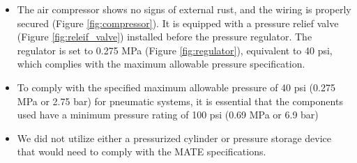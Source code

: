 \documentclass[11pt, twocolumn]{article}
\begin{document}
\begin{itemize}[leftmargin=0pt, itemindent=10pt]
    \setlength{\itemsep}{0pt}
    \item The air compressor shows no signs of external rust, and the wiring is properly secured (Figure \ref{fig:compressor}). It is equipped with a pressure relief valve (Figure \ref{fig:releif_valve}) installed before the pressure regulator. The regulator is set to 0.275 MPa (Figure \ref{fig:regulator}), equivalent to 40 psi, which complies with the maximum allowable pressure specification.
    \item To comply with the specified maximum allowable pressure of 40 psi (0.275 MPa or 2.75 bar) for pneumatic systems, it is essential that the components used have a minimum pressure rating of 100 psi (0.69 MPa or 6.9 bar)
    \item We did not utilize either a pressurized cylinder or pressure storage device that would need to comply with the MATE specifications.


\end{itemize}
\end{document}
